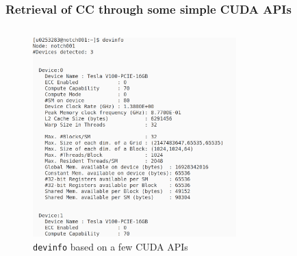 \begin{frame}
   \frametitle{Retrieval of CC through some simple CUDA APIs}
     \begin{columns}
    \begin{figure}[H]
       \centering
          \includegraphics[width=0.70\textwidth]{./img/devinfo.png}
	    \caption{\small{\texttt{devinfo} based on a few CUDA APIs}}
     \end{figure}
     \end{columns}
\end{frame}


